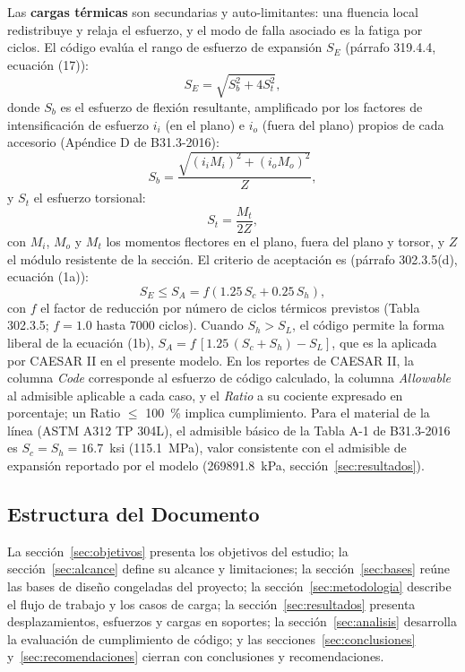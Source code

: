 Las \textbf{cargas t\'{e}rmicas} son secundarias y auto-limitantes: una fluencia
local redistribuye y relaja el esfuerzo, y el modo de falla asociado es la fatiga
por ciclos. El c\'{o}digo eval\'{u}a el rango de esfuerzo de expansi\'{o}n $S_E$
(p\'{a}rrafo 319.4.4, ecuaci\'{o}n (17)):
\begin{equation}
    S_E = \sqrt{S_b^2 + 4 S_t^2},
    \label{eq:se}
\end{equation}
donde $S_b$ es el esfuerzo de flexi\'{o}n resultante, amplificado por los
factores de intensificaci\'{o}n de esfuerzo $i_i$ (en el plano) e $i_o$ (fuera del
plano) propios de cada accesorio (Ap\'{e}ndice D de B31.3-2016):
\begin{equation}
    S_b = \frac{\sqrt{(i_i M_i)^2 + (i_o M_o)^2}}{Z},
    \label{eq:sb}
\end{equation}
y $S_t$ el esfuerzo torsional:
\begin{equation}
    S_t = \frac{M_t}{2 Z},
    \label{eq:st}
\end{equation}
con $M_i$, $M_o$ y $M_t$ los momentos flectores en el plano, fuera del plano y
torsor, y $Z$ el m\'{o}dulo resistente de la secci\'{o}n. El criterio de
aceptaci\'{o}n es (p\'{a}rrafo 302.3.5(d), ecuaci\'{o}n (1a)):
\begin{equation}
    S_E \leq S_A = f \left( 1.25 \, S_c + 0.25 \, S_h \right),
    \label{eq:sa}
\end{equation}
con $f$ el factor de reducci\'{o}n por n\'{u}mero de ciclos t\'{e}rmicos previstos
(Tabla 302.3.5; $f = 1.0$ hasta 7000 ciclos). Cuando $S_h > S_L$, el c\'{o}digo
permite la forma liberal de la ecuaci\'{o}n (1b),
$S_A = f\,[1.25\,(S_c + S_h) - S_L]$, que es la aplicada por CAESAR II en el
presente modelo. En los reportes de CAESAR II, la columna \textit{Code}
corresponde al esfuerzo de c\'{o}digo calculado, la columna \textit{Allowable} al
admisible aplicable a cada caso, y el \textit{Ratio} a su cociente expresado en
porcentaje; un Ratio $\leq$ 100~\% implica cumplimiento. Para el material de la
l\'{i}nea (ASTM A312 TP 304L), el admisible b\'{a}sico de la Tabla A-1 de
B31.3-2016 es $S_c = S_h = 16.7$~ksi (\num{115.1}~\si{MPa}), valor consistente
con el admisible de expansi\'{o}n reportado por el modelo
(\num{269891.8}~\si{kPa}, secci\'{o}n~\ref{sec:resultados}).

\subsection{Estructura del Documento}

La secci\'{o}n~\ref{sec:objetivos} presenta los objetivos del estudio; la
secci\'{o}n~\ref{sec:alcance} define su alcance y limitaciones; la
secci\'{o}n~\ref{sec:bases} re\'{u}ne las bases de dise\~{n}o congeladas del
proyecto; la secci\'{o}n~\ref{sec:metodologia} describe el flujo de trabajo y
los casos de carga; la secci\'{o}n~\ref{sec:resultados} presenta
desplazamientos, esfuerzos y cargas en soportes; la
secci\'{o}n~\ref{sec:analisis} desarrolla la evaluaci\'{o}n de cumplimiento de
c\'{o}digo; y las secciones~\ref{sec:conclusiones} y~\ref{sec:recomendaciones}
cierran con conclusiones y recomendaciones.
